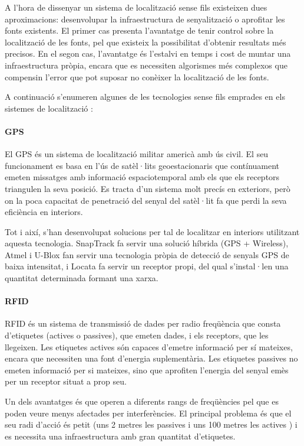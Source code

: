 A l'hora de dissenyar un sistema de localització sense fils existeixen dues aproximacions: desenvolupar la infraestructura de senyalització o aprofitar les fonts existents. El primer cas presenta l'avantatge de tenir control sobre la localització de les fonts, pel que existeix la possibilitat d'obtenir resultats més precisos. En el segon cas, l'avantatge és l'estalvi en temps i cost de muntar una infraestructura pròpia, encara que es necessiten algorismes més complexos que compensin l'error que pot suposar no conèixer la localització de les fonts.

A continuació s'enumeren algunes de les tecnologies sense fils emprades en els sistemes de localització \cite{liu}:

\paragraph{GPS}

El GPS és un sistema de localització militar americà amb ús civil. El seu funcionament es basa en l’ús de satèl·lits geoestacionaris que contínuament emeten missatges amb informació espaciotemporal amb els que els receptors triangulen la seva posició. Es tracta d’un sistema molt precís en exteriors, però on la poca capacitat de penetració del senyal del satèl·lit fa que perdi la seva eficiència en interiors.

Tot i així, s'han desenvolupat solucions per tal de localitzar en interiors utilitzant aquesta tecnologia. SnapTrack\cite{moeglein} fa servir una solució híbrida (GPS + Wireless), Atmel\cite{liu} i U-Blox \cite{wieser} fan servir una tecnologia pròpia de detecció de senyals GPS de baixa intensitat, i Locata \cite{barnes} fa servir un receptor propi, del qual s'instal·len una quantitat determinada formant una xarxa.

\paragraph{RFID}

RFID és un sistema de transmissió de dades per radio freqüència que consta d'etiquetes (actives o passives), que emeten dades, i els receptors, que les llegeixen. Les etiquetes actives són capaces d’emetre informació per sí mateixes, encara que necessiten una font d'energia suplementària. Les etiquetes passives no emeten informació per si mateixes, sino que aprofiten l'energia del senyal emès per un receptor situat a prop seu.

Un dels avantatges és que operen a diferents rangs de freqüències pel que es poden veure menys afectades per interferències. El principal problema és que el seu radi d'acció és petit (uns 2 metres les passives i uns 100 metres les actives \cite{chan}) i es necessita una infraestructura amb gran quantitat d'etiquetes.

